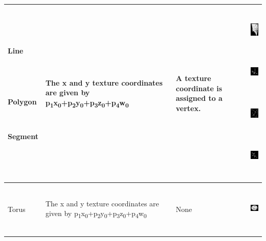 \begin{center}
\begin{supertabular}{|m{0.7122598in}|m{3.22956in}|m{0.9816598in}|m{0.7559598in}|}
~

Line

~

~

Polygon

~

Segment

~
 &
The x and y texture coordinates are given by
p\textsubscript{1}x\textsubscript{0}+p\textsubscript{2}y\textsubscript{0}+p\textsubscript{3}z\textsubscript{0}+p\textsubscript{4}w\textsubscript{0}
 &
A texture coordinate is assigned to a vertex.  &


\begin{center}
\includegraphics[width=0.6602in,height=0.6602in]{ub-img/ub-img27.jpg}
\end{center}
\begin{center}
\includegraphics[width=0.6602in,height=0.6602in]{ub-img/ub-img28.jpg}
\end{center}
\begin{center}
\includegraphics[width=0.6602in,height=0.6602in]{ub-img/ub-img29.jpg}
\end{center}
\begin{center}
\includegraphics[width=0.6602in,height=0.6602in]{ub-img/ub-img30.jpg}
\end{center}
\\\hline
Torus &
The x and y texture coordinates are given by
p\textsubscript{1}x\textsubscript{0}+p\textsubscript{2}y\textsubscript{0}+p\textsubscript{3}z\textsubscript{0}+p\textsubscript{4}w\textsubscript{0}
&
None &
\begin{center}
\includegraphics[width=0.6693in,height=0.698in]{ub-img/ub-img31.jpg}
\end{center}
\\\hline
\end{supertabular}
\end{center}

